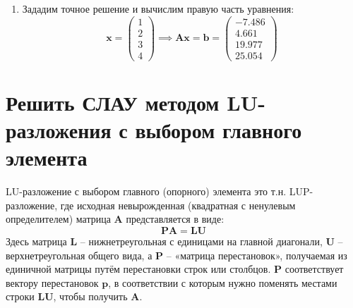 \begin{enumerate}
\item Зададим точное решение и вычислим правую часть уравнения:
\begin{equation}
    \mathbf{x} =
    \begin{pmatrix}
        1\\ 2\\ 3\\ 4
    \end{pmatrix}\implies
    \mathbf{Ax} = \mathbf{b} =
     \begin{pmatrix}
       -7.486\\ 4.661\\ 19.977\\ 25.054
    \end{pmatrix}
\end{equation}
\end{enumerate}

\clearpage
\section{Решить СЛАУ методом LU-разложения с выбором главного элемента}
LU-разложение с выбором главного (опорного) элемента это т.н. LUP-разложение, где исходная невырожденная (квадратная с ненулевым определителем) матрица $\mathbf{A}$ представляется в виде:
\begin{equation}
    \mathbf{PA} = \mathbf{LU}
\end{equation}
Здесь матрица $\mathbf{L}$ -- нижнетреугольная с единицами на главной диагонали, $\mathbf{U}$ -- верхнетреугольная общего вида, а $\mathbf{P}$ -- «матрица перестановок», получаемая из единичной матрицы путём перестановки строк или столбцов. $\mathbf{P}$ соответствует вектору перестановок $\mathbf{p}$, в соответствии с которым нужно поменять местами строки $\mathbf{LU}$, чтобы получить $\mathbf{A}$.

